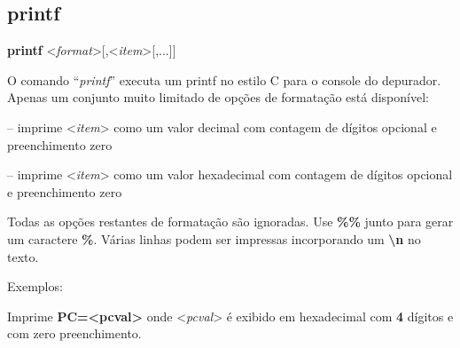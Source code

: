 \documentclass[letterpaper,10pt,brazil]{sphinxmanual}
\begin{document}
\subsection{printf}
\label{debugger/general:debugger-command-printf}\label{debugger/general:printf}
\begin{DUlineblock}{0em}
\item[]
\begin{DUlineblock}{\DUlineblockindent}
\item[] \textbf{printf} \textless{}\emph{format}\textgreater{}{[},\textless{}\emph{item}\textgreater{}{[},...{]}{]}
\item[] 
\end{DUlineblock}
\item[] O comando ``\emph{printf}'' executa um printf no estilo C para o console do depurador. Apenas um conjunto muito limitado de opções de formatação está disponível:
\item[] 
\item[]
\begin{DUlineblock}{\DUlineblockindent}
\item[]  -- imprime \textless{}\emph{item}\textgreater{} como um valor decimal com contagem de dígitos opcional e preenchimento zero
\item[]  -- imprime \textless{}\emph{item}\textgreater{} como um valor hexadecimal com contagem de dígitos opcional e preenchimento zero
\item[] 
\end{DUlineblock}
\item[] Todas as opções restantes de formatação são ignoradas. Use \textbf{\%\%} junto para gerar um caractere \textbf{\%}. Várias linhas podem ser impressas incorporando um \textbf{\textbackslash{}n} no texto.
\item[] 
\item[] Exemplos:
\item[] 
\item[]
\begin{DUlineblock}{\DUlineblockindent}
\item[] 
\item[] 
\end{DUlineblock}
\item[] Imprime \textbf{PC=\textless{}pcval\textgreater{}} onde \textless{}\emph{pcval}\textgreater{} é exibido em hexadecimal com \textbf{4} dígitos e com zero preenchimento.

\end{DUlineblock}
\end{document}
